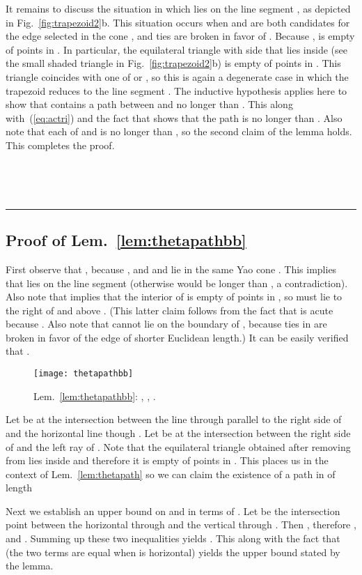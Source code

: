 \documentclass[11pt]{article}
\newcommand{\qed}{\rule{0.5em}{1.5ex}}
\newcommand{\fqed}{{\hfill~\qed}}
\newcommand{\eproof}{{\hfill~\fqed} \vspace{1em}}
\begin{document}
It remains to discuss the situation in which  lies on the line segment , as depicted in Fig.~\ref{fig:trapezoid2}b. This situation occurs when  and  are both candidates for the  edge selected in the cone , and ties are broken in favor of . Because ,  is empty of points in . In particular, the equilateral triangle with side  that lies inside  (see the small shaded triangle in Fig.~\ref{fig:trapezoid2}b) is empty of points in . This triangle coincides with one of  or , so this is again a degenerate case in which the trapezoid   reduces to the line segment . The inductive hypothesis applies here to show that  contains a path between  and  no longer than . This along with~(\ref{eq:actri}) and the fact that  shows that the path  is no longer than . Also note that each of  and  is no longer than , so the second claim of the lemma holds. This completes the proof.
\eproof

\subsection{Proof of Lem.~\ref{lem:thetapathbb}}


First observe that , because , and  and  lie in the same Yao cone . This implies that  lies on the line segment  (otherwise  would be longer than , a contradiction). Also note that  implies that the interior of  is empty of points in , so  must lie to the right of  and above . (This latter claim follows from the fact that
 is acute because . Also note that  cannot lie on the boundary of , because ties in  are broken in favor of the edge of shorter Euclidean length.) It can be easily verified that .
\begin{figure}[htpb]
\centering
\texttt{[image: thetapathbb]}
\caption{Lem.~\ref{lem:thetapathbb}: , , .}
\label{fig:thetapathbb}
\end{figure}


Let  be at the intersection between the line through  parallel to the right side of  and the horizontal line though . Let  be at the intersection between the right side of  and the left ray of . Note that the equilateral triangle obtained after removing  from  lies inside  and therefore it is empty of points in .
This places us in the context of Lem.~\ref{lem:thetapath} so we can claim the existence of a path  in  of length

Next we establish an upper bound on  and  in terms of . Let  be the intersection point between the horizontal through  and the vertical through . Then , therefore , and
. Summing up these two inequalities yields
. This along with the fact that  (the two terms are equal when  is horizontal) yields the upper bound stated by the lemma.
\end{document}

